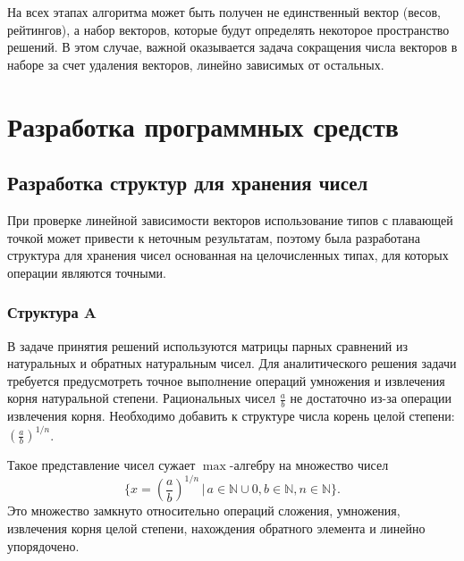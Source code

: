 \documentclass[specialist,
substylefile = spbu.rtx,
               subf,href,colorlinks=true, 12pt]{disser}
\begin{document}
    На всех этапах алгоритма может быть получен не единственный вектор (весов, рейтингов), а набор векторов, которые будут определять некоторое пространство решений. В этом случае, важной оказывается задача сокращения числа векторов в наборе за счет удаления векторов, линейно зависимых от остальных.

    \chapter{Разработка программных средств}

    \section{Разработка структур для хранения чисел}

    При проверке линейной зависимости векторов использование типов с плавающей точкой может привести к неточным результатам, поэтому была разработана структура для хранения чисел основанная на целочисленных типах, для которых операции являются точными.

    \subsection{Структура A}

    В задаче принятия решений используются матрицы парных сравнений из натуральных и обратных натуральным чисел.
    Для аналитического решения задачи требуется предусмотреть точное выполнение операций умножения и извлечения корня натуральной степени.
    Рациональных чисел $\displaystyle \frac{a}{b}$ не достаточно из-за операции извлечения корня. 
    Необходимо добавить к структуре числа корень целой степени:  $\displaystyle \left(\frac{a}{b}\right)^{1/n}$.
    
    Такое представление чисел сужает $\max$-алгебру на множество чисел
    $$\Big\{x = \displaystyle \left(\frac{a}{b}\right)^{1/n} \, |\, a \in \mathbb{N} \cup 0, b \in \mathbb{N}, n \in \mathbb{N}\Big\}.$$ Это множество замкнуто относительно операций сложения, умножения, извлечения корня целой степени, нахождения обратного элемента и линейно упорядочено. 
\end{document}
